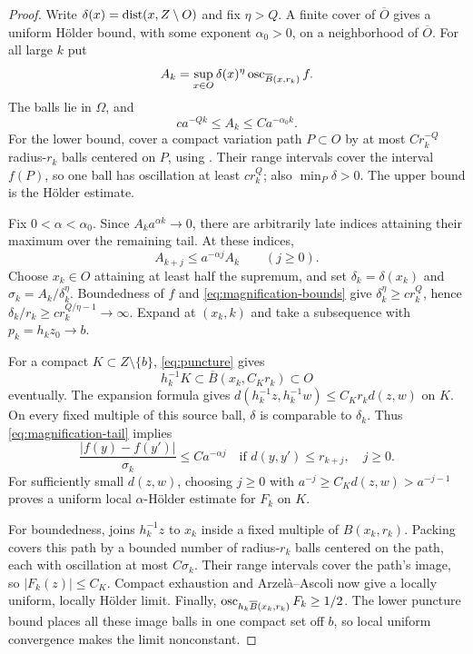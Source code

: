 \begin{proof}
Write $\delta(x)=\operatorname{dist}(x,Z\setminus O)$ and fix $\eta>Q$.
A finite cover of $\overline O$ gives a uniform H\"older bound,
with some exponent $\alpha_0>0$, on a neighborhood of $\overline O$.
For all large $k$ put
\[
 A_k=\sup_{x\in O}\delta(x)^\eta
            \operatorname{osc}_{\overline B(x,r_k)}f.
\]
The balls lie in $\Omega$, and
\begin{equation}
 c a^{-Qk}\le A_k\le C a^{-\alpha_0 k}.
 \label{eq:magnification-bounds}
\end{equation}
For the lower bound, cover a compact variation path $P\subset O$
by at most $C r_k^{-Q}$ radius-$r_k$ balls centered on $P$, using
. Their range intervals cover the interval $f(P)$,
so one ball has oscillation at least $c r_k^Q$; also
$\min_P\delta>0$. The upper bound is the H\"older estimate.

Fix $0<\alpha<\alpha_0$. Since $A_k a^{\alpha k}\to0$, there are
arbitrarily late indices attaining their maximum over the remaining
tail. At these indices,
\begin{equation}
 A_{k+j}\le a^{-\alpha j}A_k\qquad(j\ge0).
 \label{eq:magnification-tail}
\end{equation}
Choose $x_k\in O$ attaining at least half the supremum, and set
$\delta_k=\delta(x_k)$ and $\sigma_k=A_k/\delta_k^\eta$.
Boundedness of $f$ and \eqref{eq:magnification-bounds} give
$\delta_k^\eta\ge c r_k^Q$, hence
$\delta_k/r_k\ge c r_k^{Q/\eta-1}\to\infty$.
Expand at $(x_k,k)$ and take a subsequence with $p_k=h_kz_0\to b$.

For a compact $K\subset Z\setminus\{b\}$, \eqref{eq:puncture} gives
\begin{equation}
 h_k^{-1}K\subset\overline B(x_k,C_Kr_k)\subset O
 \label{eq:magnification-preimage}
\end{equation}
eventually. The expansion formula gives
$d(h_k^{-1}z,h_k^{-1}w)\le C_Kr_kd(z,w)$ on $K$.
On every fixed multiple of this source ball, $\delta$ is comparable
to $\delta_k$. Thus \eqref{eq:magnification-tail} implies
\begin{equation}
 \frac{|f(y)-f(y')|}{\sigma_k}\le C a^{-\alpha j}
 \quad\text{if }d(y,y')\le r_{k+j},\quad j\ge0.
 \label{eq:magnification-local-holder}
\end{equation}
For sufficiently small $d(z,w)$, choosing $j\ge0$ with
$a^{-j}\ge C_Kd(z,w)>a^{-j-1}$ proves a uniform local
$\alpha$-H\"older estimate for $F_k$ on $K$.

For boundedness,  joins $h_k^{-1}z$ to $x_k$
inside a fixed multiple of $B(x_k,r_k)$. Packing covers this path
by a bounded number of radius-$r_k$ balls centered on the path, each with oscillation
at most $C\sigma_k$. Their range intervals cover the path's image,
so $|F_k(z)|\le C_K$. Compact exhaustion and Arzel\`a--Ascoli now
give a locally uniform, locally H\"older limit.
Finally, $\operatorname{osc}_{h_k\overline B(x_k,r_k)}F_k\ge1/2$.
The lower puncture bound places all these image balls in one compact
set off $b$, so local uniform convergence makes the limit nonconstant.
\end{proof}

